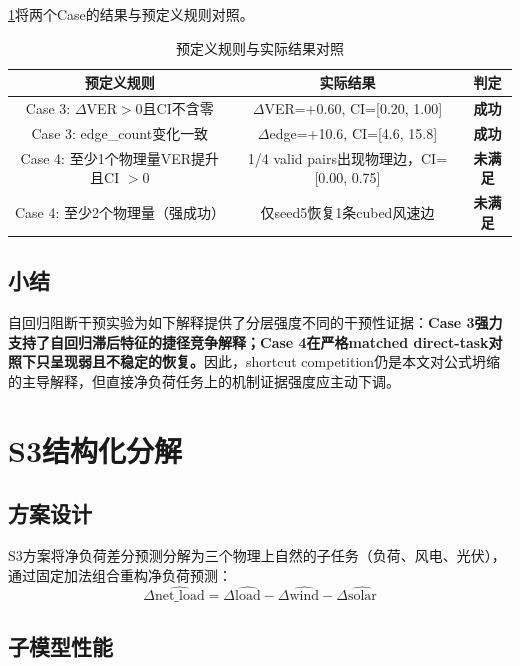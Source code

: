 \cref{tab:mechanism-check}将两个Case的结果与预定义规则对照。

\begin{table}[htbp]
\centering
\caption{预定义规则与实际结果对照}
\label{tab:mechanism-check}
\begin{tabular}{ccc}
\toprule
预定义规则 & 实际结果 & 判定 \\
\midrule
Case 3: $\Delta$VER$>0$且CI不含零 & $\Delta$VER=+0.60, CI=[0.20, 1.00] & \textbf{成功} \\
Case 3: edge\_count变化一致 & $\Delta$edge=+10.6, CI=[4.6, 15.8] & \textbf{成功} \\
Case 4: 至少1个物理量VER提升且CI $> 0$ & 1/4 valid pairs出现物理边，CI=[0.00, 0.75] & \textbf{未满足} \\
Case 4: 至少2个物理量（强成功） & 仅seed5恢复1条cubed风速边 & \textbf{未满足} \\
\bottomrule
\end{tabular}
\end{table}

\subsection{小结}

自回归阻断干预实验为如下解释提供了分层强度不同的干预性证据：\textbf{Case 3强力支持了自回归滞后特征的捷径竞争解释；Case 4在严格matched direct-task对照下只呈现弱且不稳定的恢复。}因此，shortcut competition仍是本文对公式坍缩的主导解释，但直接净负荷任务上的机制证据强度应主动下调。

\section{S3结构化分解}

\subsection{方案设计}

S3方案将净负荷差分预测分解为三个物理上自然的子任务（负荷、风电、光伏），通过固定加法组合重构净负荷预测：
\begin{equation}
\Delta\widehat{\text{net\_load}} = \Delta\hat{\text{load}} - \Delta\hat{\text{wind}} - \Delta\hat{\text{solar}}
\end{equation}

\subsection{子模型性能}

